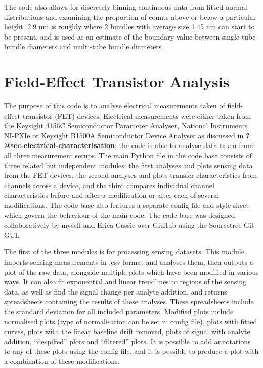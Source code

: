 \documentclass[
  a4paper,
]{scrbook}
\begin{document}
The code also allows for discretely binning continuous data from fitted
normal distributions and examining the proportion of counts above or
below a particular height. 2.9 nm is roughly where 2 bundles with
average size 1.45 nm can start to be present, and is used as an estimate
of the boundary value between single-tube bundle diameters and
multi-tube bundle diameters.

\hypertarget{sec-field-effect-transistor-analysis}{%
\section{Field-Effect Transistor
Analysis}\label{sec-field-effect-transistor-analysis}}

The purpose of this code is to analyse electrical measurements taken of
field-effect transistor (FET) devices. Electrical measurements were
either taken from the Keysight 4156C Semiconductor Parameter Analyser,
National Instruments NI-PXIe or Keysight B1500A Semiconductor Device
Analyser as discussed in \textbf{?@sec-electrical-characterisation}; the
code is able to analyse data taken from all three measurement setups.
The main Python file in the code base consists of three related but
independent modules: the first analyses and plots sensing data from the
FET devices, the second analyses and plots transfer characteristics from
channels across a device, and the third compares individual channel
characteristics before and after a modification or after each of several
modifications. The code base also features a separate config file and
style sheet which govern the behaviour of the main code. The code base
was designed collaboratively by myself and Erica Cassie over GitHub
using the Sourcetree Git GUI.

The first of the three modules is for processing sensing datasets. This
module imports sensing measurements in .csv format and analyses them,
then outputs a plot of the raw data, alongside multiple plots which have
been modified in various ways. It can also fit exponential and linear
trendlines to regions of the sensing data, as well as find the signal
change per analyte addition, and returns spreadsheets containing the
results of these analyses. These spreadsheets include the standard
deviation for all included parameters. Modified plots include normalised
plots (type of normalisation can be set in config file), plots with
fitted curves, plots with the linear baseline drift removed, plots of
signal with analyte addition, ``despiked'' plots and ``filtered'' plots.
It is possible to add annotations to any of these plots using the config
file, and it is possible to produce a plot with a combination of these
modifications.
\end{document}
